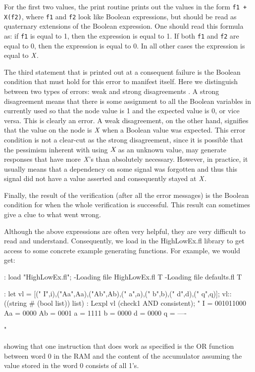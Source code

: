 For the first two values, the print routine prints out the values
in the form {\tt f1 + X(f2)}, where {\tt f1} and {\tt f2} look like
Boolean expressions, but should be read as quaternary%
%
{} extensions of
the Boolean expression.
One should read this formula as: if {\tt f1} is equal to 1, then the expression
is equal to 1.
If both {\tt f1} and {\tt f2} are equal to 0, then the expression is equal
to 0.
In all other cases the expression is equal to $\mbox{\em X}$.

The third statement that is printed out at a consequent failure is
the Boolean condition that must hold for this error to manifest itself.
Here we distinguish between two types of errors: weak and strong disagreements%
%
%
{}.
A strong disagreement means that there is some assignment to all the Boolean
variables in currently used so that the node value is 1 and the expected
value is 0, or vice versa.
This is clearly an error.
A weak disagreement, on the other hand, signifies that the value on the
node is $\mbox{\em X}$ when a Boolean value was expected.
This error condition is not a clear-cut as the strong disagreement, since
it is possible that the pessimism%
%
{} inherent with using $\mbox{\em X}$ as an unknown
value, may generate responses that have more $\mbox{\em X}$'s than absolutely necessary. 
However, in practice, it usually means that a dependency%
%
{} on some signal
was forgotten and thus this signal did not have a value asserted and
consequently stayed at $\mbox{\em X}$.

Finally, the result of the verification (after all the error messages)
is the Boolean condition for when the whole verification is successful.
This result can sometimes give a clue to what went wrong.

Although the above expressions are often very helpful, they are
very difficult to read and understand.
Consequently, we load in the HighLowEx.fl%
%
%
{} library to get access
to some concrete example generating functions.
For example, we would get:
\begin{hol}
: load "HighLowEx.fl";
-Loading file HighLowEx.fl
T
-Loading file defaults.fl
T

: let vl = [(" I",i),("Aa",Aa),("Ab",Ab),(" a",a),(" b",b),(" d",d),(" q",q)];
vl::((string # (bool list)) list)
: Lexpl vl (check1 AND consistent);
"
 I = 001011000
Aa = 0000
Ab = 0001
 a = 1111
 b = 0000
 d = 0000
 q = ----

"
\end{hol}
showing that one instruction that does work as specified is
the OR function between word 0 in the RAM and the content of the accumulator
assuming the value stored in the word 0 consists of all 1's.

